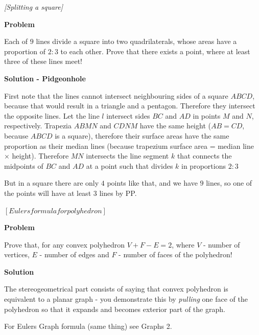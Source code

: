
%
%



\noindent 

\begin{problem}
\textit{[Splitting a square]}

\textbf{Problem}

Each of $9$ lines divide a square into two quadrilaterals, whose areas have a proportion of $2:3$ to each other. Prove that there exists a point, where at least three of these lines meet!

\textbf{Solution - Pidgeonhole}

First note that the lines cannot intersect neighbouring sides of a square $ABCD$, because that would result in a triangle and a pentagon. Therefore they intersect the opposite lines.
Let the line $l$ intersect sides $BC$ and $AD$ in points $M$ and $N$, respectively. Trapezia $ABMN$ and $CDNM$ have the same height ($AB = CD$, because $ABCD$ is a square), therefore their surface areas have the same proportion as their median lines (because trapezium surface area = median line $\times$ height). 
Therefore $MN$ intersects the line segment $k$ that connects the midpoints of $BC$ and $AD$ at a point such that divides $k$ in proportions $2:3$

But in a square there are only $4$ points like that, and we have $9$ lines, so one of the points will have at least $3$ lines by PP.
\end{problem}
%

\begin{problem}
$[Eulers formula for polyhedron]$

\textbf{Problem}

Prove that, for any convex polyhedron $V+F-E=2$, where $V$ - number of vertices, $E$ - number of edges and $F$ - number of faces of the polyhedron!

\textbf{Solution}

The stereogeometrical part consists of saying that convex polyhedron is equivalent to a planar graph - you demonstrate this by \textit{pulling} one face of the polyhedron so that it expands and becomes exterior part of the graph.

For Eulers Graph formula (same thing) see Graphs 2.
\end{problem}

